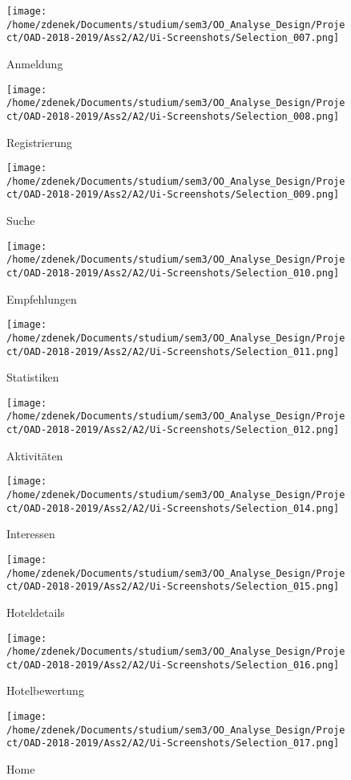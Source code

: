 \documentclass[a4paper]{article}
\begin{document}
\begin{figure}[h]
\centering
\caption{Anmeldung}
\texttt{[image: /home/zdenek/Documents/studium/sem3/OO\_Analyse\_Design/Project/OAD-2018-2019/Ass2/A2/Ui-Screenshots/Selection\_007.png]}
\end{figure}

\begin{figure}[h]
\centering
\caption{Registrierung}
\texttt{[image: /home/zdenek/Documents/studium/sem3/OO\_Analyse\_Design/Project/OAD-2018-2019/Ass2/A2/Ui-Screenshots/Selection\_008.png]}
\end{figure}

\begin{figure}[h]
\centering
\caption{Suche}
\texttt{[image: /home/zdenek/Documents/studium/sem3/OO\_Analyse\_Design/Project/OAD-2018-2019/Ass2/A2/Ui-Screenshots/Selection\_009.png]}
\end{figure}

\begin{figure}[h]
\centering
\caption{Empfehlungen}
\texttt{[image: /home/zdenek/Documents/studium/sem3/OO\_Analyse\_Design/Project/OAD-2018-2019/Ass2/A2/Ui-Screenshots/Selection\_010.png]}
\end{figure}

\begin{figure}[h]
\centering
\caption{Statistiken}
\texttt{[image: /home/zdenek/Documents/studium/sem3/OO\_Analyse\_Design/Project/OAD-2018-2019/Ass2/A2/Ui-Screenshots/Selection\_011.png]}
\end{figure}

\begin{figure}[h]
\centering
\caption{Aktivitäten}
\texttt{[image: /home/zdenek/Documents/studium/sem3/OO\_Analyse\_Design/Project/OAD-2018-2019/Ass2/A2/Ui-Screenshots/Selection\_012.png]}
\end{figure}

\begin{figure}[h]
\centering
\caption{Interessen}
\texttt{[image: /home/zdenek/Documents/studium/sem3/OO\_Analyse\_Design/Project/OAD-2018-2019/Ass2/A2/Ui-Screenshots/Selection\_014.png]}
\end{figure}

\begin{figure}[h]
\centering
\caption{Hoteldetails}
\texttt{[image: /home/zdenek/Documents/studium/sem3/OO\_Analyse\_Design/Project/OAD-2018-2019/Ass2/A2/Ui-Screenshots/Selection\_015.png]}
\end{figure}

\begin{figure}[h]
\centering
\caption{Hotelbewertung}
\texttt{[image: /home/zdenek/Documents/studium/sem3/OO\_Analyse\_Design/Project/OAD-2018-2019/Ass2/A2/Ui-Screenshots/Selection\_016.png]}
\end{figure}

\begin{figure}[h]
\centering
\caption{Home}
\texttt{[image: /home/zdenek/Documents/studium/sem3/OO\_Analyse\_Design/Project/OAD-2018-2019/Ass2/A2/Ui-Screenshots/Selection\_017.png]}
\end{figure}
\end{document}
